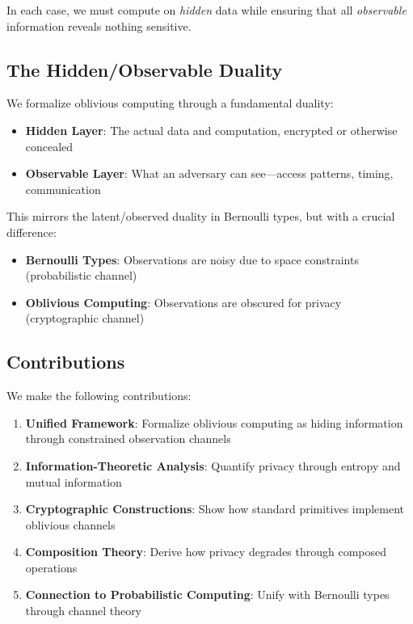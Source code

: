 \documentclass[11pt,final,hidelinks]{article}
\begin{document}
In each case, we must compute on \emph{hidden} data while ensuring that all \emph{observable} information reveals nothing sensitive.

\subsection{The Hidden/Observable Duality}

We formalize oblivious computing through a fundamental duality:

\begin{itemize}
    \item \textbf{Hidden Layer}: The actual data and computation, encrypted or otherwise concealed
    \item \textbf{Observable Layer}: What an adversary can see—access patterns, timing, communication
\end{itemize}

This mirrors the latent/observed duality in Bernoulli types, but with a crucial difference:
\begin{itemize}
    \item \textbf{Bernoulli Types}: Observations are noisy due to space constraints (probabilistic channel)
    \item \textbf{Oblivious Computing}: Observations are obscured for privacy (cryptographic channel)
\end{itemize}

\subsection{Contributions}

We make the following contributions:

\begin{enumerate}
    \item \textbf{Unified Framework}: Formalize oblivious computing as hiding information through constrained observation channels
    \item \textbf{Information-Theoretic Analysis}: Quantify privacy through entropy and mutual information
    \item \textbf{Cryptographic Constructions}: Show how standard primitives implement oblivious channels
    \item \textbf{Composition Theory}: Derive how privacy degrades through composed operations
    \item \textbf{Connection to Probabilistic Computing}: Unify with Bernoulli types through channel theory
\end{enumerate}
\end{document}

